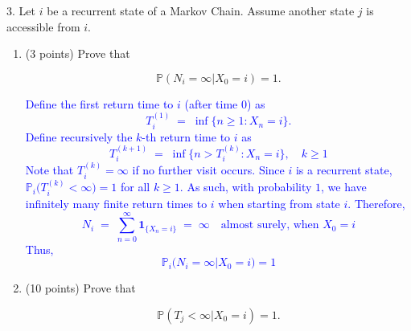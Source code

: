 \documentclass{article}
\begin{document}
3. Let $i$ be a recurrent state of a Markov Chain. Assume another state $j$ is accessible from $i$.

\begin{enumerate}[label=(\alph*)]
    \item (3 points) Prove that 

\[
\mathbb{P}(N_i = \infty | X_0 = i) = 1.
\]

\textcolor{blue}{
Define the first return time to \(i\) (after time \(0\)) as
\[
T_i^{(1)} \;=\; \inf\{n \ge 1 : X_n = i\}.
\]
Define recursively the \(k\)-th return time to \(i\) as
\[
T_i^{(k+1)} 
\;=\;
\inf\{n > T_i^{(k)} : X_n = i\}, 
\quad
k \ge 1
\]
Note that \(T_i^{(k)} = \infty\) if no further visit occurs.
Since \(i\) is a recurrent state,  
\(\mathbb{P}_i\bigl(T_i^{(k)} < \infty\bigr) = 1\) for all \(k \ge 1\).
As such, with probability \(1\), we have infinitely many finite return times to \(i\) when starting from state $i$. 
Therefore, 
\[
N_i \;=\; 
\sum_{n=0}^\infty \mathbf{1}_{\{X_n = i\}} 
\;=\;
\infty
\quad
\text{almost surely, when }X_0 = i
\]
Thus,
\[
\mathbb{P}_i\bigl(N_i = \infty\bigr | X_0=i) = 1
\]
}

\item (10 points) Prove that 

\[
\mathbb{P}(T_j < \infty | X_0 = i) = 1.
\]


\end{enumerate}
\end{document}

